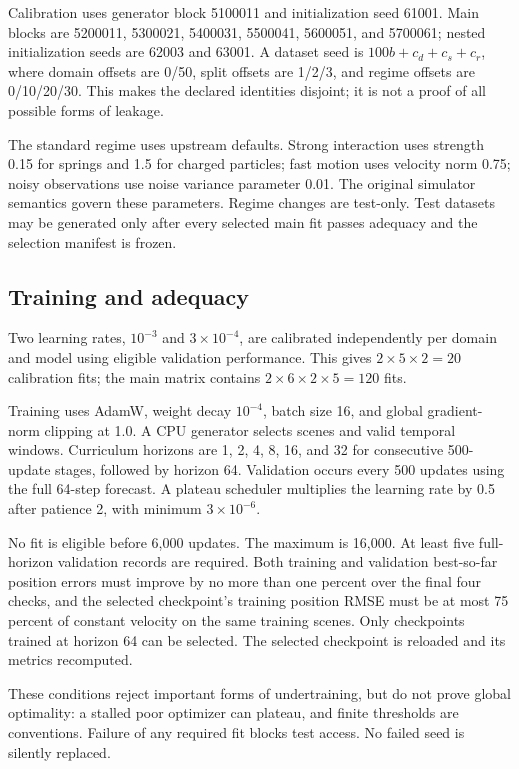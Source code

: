 \documentclass[10pt]{article}
\begin{document}
Calibration uses generator block 5100011 and initialization seed 61001. Main blocks are 5200011, 5300021, 5400031, 5500041, 5600051, and 5700061; nested initialization seeds are 62003 and 63001. A dataset seed is $100b+c_d+c_s+c_r$, where domain offsets are 0/50, split offsets are 1/2/3, and regime offsets are 0/10/20/30. This makes the declared identities disjoint; it is not a proof of all possible forms of leakage.

The standard regime uses upstream defaults. Strong interaction uses strength 0.15 for springs and 1.5 for charged particles; fast motion uses velocity norm 0.75; noisy observations use noise variance parameter 0.01. The original simulator semantics govern these parameters. Regime changes are test-only. Test datasets may be generated only after every selected main fit passes adequacy and the selection manifest is frozen.

\subsection{Training and adequacy}
Two learning rates, $10^{-3}$ and $3\times10^{-4}$, are calibrated independently per domain and model using eligible validation performance. This gives $2\times5\times2=20$ calibration fits; the main matrix contains $2\times6\times2\times5=120$ fits.

Training uses AdamW, weight decay $10^{-4}$, batch size 16, and global gradient-norm clipping at 1.0. A CPU generator selects scenes and valid temporal windows. Curriculum horizons are 1, 2, 4, 8, 16, and 32 for consecutive 500-update stages, followed by horizon 64. Validation occurs every 500 updates using the full 64-step forecast. A plateau scheduler multiplies the learning rate by 0.5 after patience 2, with minimum $3\times10^{-6}$.

No fit is eligible before 6,000 updates. The maximum is 16,000. At least five full-horizon validation records are required. Both training and validation best-so-far position errors must improve by no more than one percent over the final four checks, and the selected checkpoint's training position RMSE must be at most 75 percent of constant velocity on the same training scenes. Only checkpoints trained at horizon 64 can be selected. The selected checkpoint is reloaded and its metrics recomputed.

These conditions reject important forms of undertraining, but do not prove global optimality: a stalled poor optimizer can plateau, and finite thresholds are conventions. Failure of any required fit blocks test access. No failed seed is silently replaced.
\end{document}
